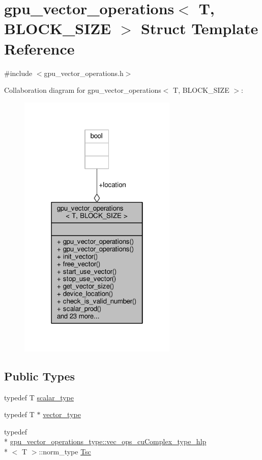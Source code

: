 \hypertarget{structgpu__vector__operations}{\section{gpu\-\_\-vector\-\_\-operations$<$ T, B\-L\-O\-C\-K\-\_\-\-S\-I\-Z\-E $>$ Struct Template Reference}
\label{structgpu__vector__operations}
}


{\ttfamily \#include $<$gpu\-\_\-vector\-\_\-operations.\-h$>$}



Collaboration diagram for gpu\-\_\-vector\-\_\-operations$<$ T, B\-L\-O\-C\-K\-\_\-\-S\-I\-Z\-E $>$\-:\nopagebreak
\begin{figure}[H]
\begin{center}
\leavevmode
\includegraphics[width=214pt]{structgpu__vector__operations__coll__graph}
\end{center}
\end{figure}
\subsection*{Public Types}
\begin{DoxyCompactItemize}
\item 
typedef T \hyperlink{structgpu__vector__operations_aaa9d1dc877967fabc2262c4a25e4796f}{scalar\-\_\-type}
\item 
typedef T $\ast$ \hyperlink{structgpu__vector__operations_adfa9fd444da5616e33af37604dc206ba}{vector\-\_\-type}
\item 
typedef \\*
\hyperlink{structgpu__vector__operations__type_1_1vec__ops__cuComplex__type__hlp}{gpu\-\_\-vector\-\_\-operations\-\_\-type\-::vec\-\_\-ops\-\_\-cu\-Complex\-\_\-type\-\_\-hlp}\\*
$<$ T $>$\-::norm\-\_\-type \hyperlink{structgpu__vector__operations_a1a029004898ae03eae1de4c8c8f4f824}{Tsc}
\end{DoxyCompactItemize}
